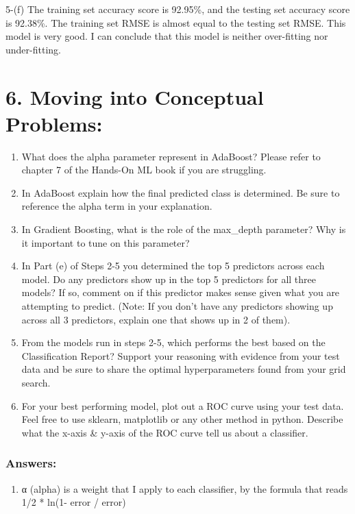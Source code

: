 \documentclass[11pt]{article}
\providecommand{\tightlist}{%
      \setlength{\itemsep}{0pt}\setlength{\parskip}{0pt}}
\begin{document}
    5-(f) The training set accuracy score is 92.95\%, and the testing set
accuracy score is 92.38\%. The training set RMSE is almost equal to the
testing set RMSE. This model is very good. I can conclude that this
model is neither over-fitting nor under-fitting.

    \hypertarget{moving-into-conceptual-problems}{%
\section{6. Moving into Conceptual
Problems:}\label{moving-into-conceptual-problems}}

    \begin{enumerate}
\def\labelenumi{\alph{enumi})}
\item
  What does the alpha parameter represent in AdaBoost? Please refer to
  chapter 7 of the Hands-On ML book if you are struggling.
\item
  In AdaBoost explain how the final predicted class is determined. Be
  sure to reference the alpha term in your explanation.
\item
  In Gradient Boosting, what is the role of the max\_depth parameter?
  Why is it important to tune on this parameter?
\item
  In Part (e) of Steps 2-5 you determined the top 5 predictors across
  each model. Do any predictors show up in the top 5 predictors for all
  three models? If so, comment on if this predictor makes sense given
  what you are attempting to predict. (Note: If you don't have any
  predictors showing up across all 3 predictors, explain one that shows
  up in 2 of them).
\item
  From the models run in steps 2-5, which performs the best based on the
  Classification Report? Support your reasoning with evidence from your
  test data and be sure to share the optimal hyperparameters found from
  your grid search.
\item
  For your best performing model, plot out a ROC curve using your test
  data. Feel free to use sklearn, matplotlib or any other method in
  python. Describe what the x-axis \& y-axis of the ROC curve tell us
  about a classifier.
\end{enumerate}

    \hypertarget{answers}{%
\subsubsection{Answers:}\label{answers}}

    \begin{enumerate}
\def\labelenumi{\alph{enumi})}
\tightlist
\item
  α (alpha) is a weight that I apply to each classifier, by the formula
  that reads 1/2 * ln(1- error / error)
\end{enumerate}
\end{document}
